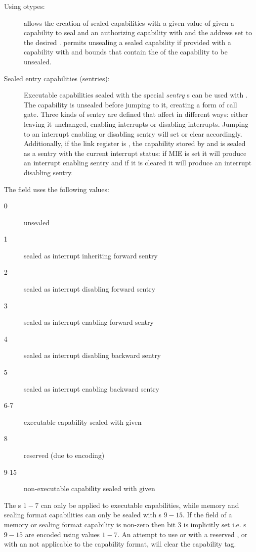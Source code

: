 \begin{description}
  \item[Using otypes:]  allows the creation of sealed capabilities with a given value of \cotype{} given a capability to seal and an authorizing capability with \cappermSeal and the address set to the desired \cotype{}.
    permits unsealing a sealed capability if provided with a capability with \cappermUnseal and bounds that contain the \cotype{} of the capability to be unsealed.
  \item[Sealed entry capabilities (sentries):] Executable capabilities sealed with the special \emph{sentry} \cotype{}s can be used with .
  The capability is unsealed before jumping to it, creating a form of call gate.
  Three kinds of sentry are defined that affect  in different ways: either leaving it unchanged, enabling interrupts or disabling interrupts.
  Jumping to an interrupt enabling or disabling sentry will set or clear  accordingly.
  Additionally, if the link register is , the capability stored by  and  is sealed as a sentry with the current interrupt status: if MIE is set it will produce an interrupt enabling sentry and if it is cleared it will produce an interrupt disabling sentry.
\end{description}
The \cotype{} field uses the following values:
\begin{description}
  \item[0] unsealed
  \item[1] sealed as interrupt inheriting forward sentry
  \item[2] sealed as interrupt disabling forward sentry
  \item[3] sealed as interrupt enabling forward sentry
  \item[4] sealed as interrupt disabling backward sentry
  \item[5] sealed as interrupt enabling backward sentry
  \item[6-7] executable capability sealed with given \cotype{}
  \item[8] reserved (due to encoding)
  \item[9-15] non-executable capability sealed with given \cotype{}
\end{description}
The \cotype{}s $1-7$ can only be applied to executable capabilities, while memory and sealing format capabilities can only be sealed with \cotype{}s $9-15$.
If the \cotype{} field of a memory or sealing format capability is non-zero then bit 3 is implicitly set i.e. \cotype{}s $9-15$ are encoded using values $1-7$.
An attempt to use  or  with a reserved \cotype{}, or with an \cotype{} not applicable to the capability format, will clear the capability tag.

